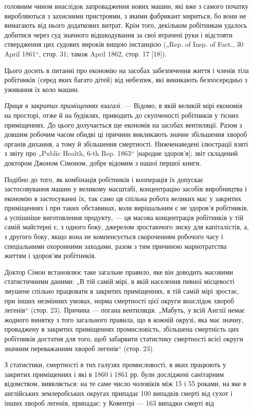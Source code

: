 \parcont{}  %
головним чином внаслідок запровадження нових машин, які вже
з самого початку виробляються з захисними пристроями, з якими
фабрикант мириться, бо вони не вимагають від нього додаткових
витрат. Крім того, декільком робітникам удалось добитися через
суд значного відшкодування за свої втрачені руки і відстояти ствердження цих судових вироків вищою
інстанцією („Rep. of
Insp. of Fact., 30 April 1861“, стор. 31; також April 1862, стор. 17 [18]).

Цього досить в питанні про економію на засобах забезпечення
життя і членів тіла робітників (серед яких багато дітей) від небезпек, які виникають безпосередньо з
уживання їх коло машин.

\emph{Праця в закритих приміщеннях взагалі}. — Відомо, в якій
великій мірі економія на просторі, отже й на будівлях, приводить до скупченості робітників у тісних
приміщеннях. До цього
долучається ще економія на засобах вентиляції. Разом з довшим
робочим часом обидві ці причини викликають значне збільшення
хвороб органів дихання, а тому й збільшення смертності. Нижченаведені ілюстрації взяті з звіту про
„Public Health, 6-th Rep.
1863“ [народне здоров’я]; звіт складений доктором Джоном
Сімоном, добре відомим з нашої першої книги.

Подібно до того, як комбінація робітників і кооперація їх
допускає застосовування машин у великому масштабі, концентрацію засобів виробництва і економію в
застосуванні їх, так
само ця спільна робота великих мас у закритих приміщеннях
і при таких обставинах, коли вирішальним є не здоров’я робітників, а успішніше виготовлення
продукту, — ця масова концентрація робітників у тій самій майстерні є, з одного боку,
джерелом зростаючого зиску для капіталістів, а, з другого боку,
якщо вона не компенсується скороченням робочого часу і спеціальними охоронними заходами, разом з тим
причиною марнотратства життям і здоров’ям робітників.

Доктор Сімон встановлює таке загальне правило, яке він доводить масовими статистичними даними: „В
тій самій мірі, в якій
населення певної місцевості змушене спільно працювати в закритих приміщеннях, в тій самій мірі
зростає, при інших
незмінних умовах, норма смертності цієї округи внаслідок
хвороб легенів“ (стор. 23). Причина — погана вентиляція. „Мабуть, у всій Англії немає жодного
винятку з того загального
правила, що в кожній окрузі, яка має значну, проваджену
в закритих приміщеннях промисловість, збільшена смертність
цих робітників достатня для того, щоб забарвити статистику
смертності всієї округи значним переважанням хвороб легенів“
(стор. 23).

З статистики, смертності в тих галузях промисловості, в яких
працюють у закритих приміщеннях і які в 1860 і 1861 рр. були
досліджені санітарним відомством, виявляється: на те саме число
чоловіків між 15 і 55 роками, на яке в англійських землеробських округах припадає 100 випадків
смерті від сухот і інших
хвороб легенів, припадає: у Ковентрі — 163 випадки смерті від
\parbreak{}  %
